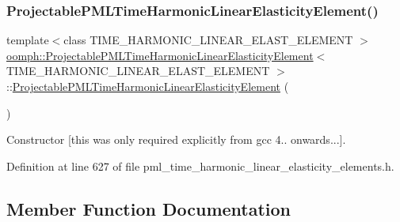 \subsubsection{\texorpdfstring{Projectable\+P\+M\+L\+Time\+Harmonic\+Linear\+Elasticity\+Element()}{ProjectablePMLTimeHarmonicLinearElasticityElement()}}
{\footnotesize\ttfamily template$<$class T\+I\+M\+E\+\_\+\+H\+A\+R\+M\+O\+N\+I\+C\+\_\+\+L\+I\+N\+E\+A\+R\+\_\+\+E\+L\+A\+S\+T\+\_\+\+E\+L\+E\+M\+E\+NT $>$ \\
\hyperlink{classoomph_1_1ProjectablePMLTimeHarmonicLinearElasticityElement}{oomph\+::\+Projectable\+P\+M\+L\+Time\+Harmonic\+Linear\+Elasticity\+Element}$<$ T\+I\+M\+E\+\_\+\+H\+A\+R\+M\+O\+N\+I\+C\+\_\+\+L\+I\+N\+E\+A\+R\+\_\+\+E\+L\+A\+S\+T\+\_\+\+E\+L\+E\+M\+E\+NT $>$\+::\hyperlink{classoomph_1_1ProjectablePMLTimeHarmonicLinearElasticityElement}{Projectable\+P\+M\+L\+Time\+Harmonic\+Linear\+Elasticity\+Element} (\begin{DoxyParamCaption}{ }\end{DoxyParamCaption})\hspace{0.3cm}{\ttfamily [inline]}}



Constructor \mbox{[}this was only required explicitly from gcc 4.. onwards...\mbox{]}. 



Definition at line 627 of file pml\+\_\+time\+\_\+harmonic\+\_\+linear\+\_\+elasticity\+\_\+elements.\+h.



\subsection{Member Function Documentation}
\mbox{\label{classoomph_1_1ProjectablePMLTimeHarmonicLinearElasticityElement_a49e06b240732712d0db73340c9f104f0}} 
